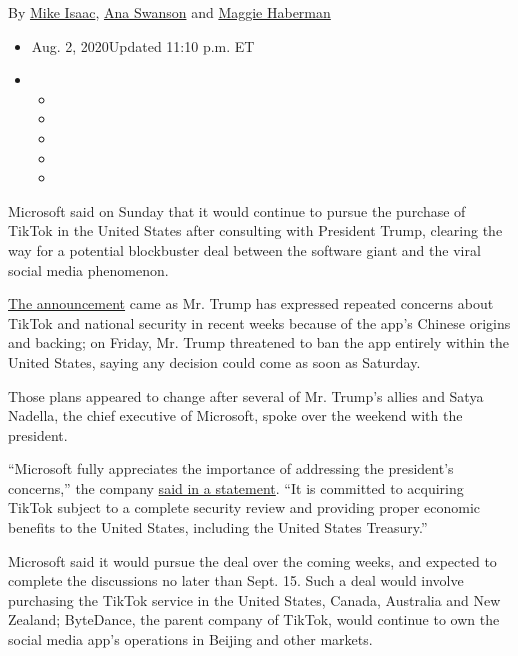 By \href{https://www.nytimes3xbfgragh.onion/by/mike-isaac}{Mike Isaac},
\href{https://www.nytimes3xbfgragh.onion/by/ana-swanson}{Ana Swanson}
and \href{https://www.nytimes3xbfgragh.onion/by/maggie-haberman}{Maggie
Haberman}

\begin{itemize}
\item
  Aug. 2, 2020Updated 11:10 p.m. ET
\item
  \begin{itemize}
  \item
  \item
  \item
  \item
  \item
  \end{itemize}
\end{itemize}

Microsoft said on Sunday that it would continue to pursue the purchase
of TikTok in the United States after consulting with President Trump,
clearing the way for a potential blockbuster deal between the software
giant and the viral social media phenomenon.

\href{https://blogs.microsoft.com/blog/2020/08/02/microsoft-to-continue-discussions-on-potential-tiktok-purchase-in-the-united-states/}{The
announcement} came as Mr. Trump has expressed repeated concerns about
TikTok and national security in recent weeks because of the app's
Chinese origins and backing; on Friday, Mr. Trump threatened to ban the
app entirely within the United States, saying any decision could come as
soon as Saturday.

Those plans appeared to change after several of Mr. Trump's allies and
Satya Nadella, the chief executive of Microsoft, spoke over the weekend
with the president.

``Microsoft fully appreciates the importance of addressing the
president's concerns,'' the company
\href{https://blogs.microsoft.com/blog/2020/08/02/microsoft-to-continue-discussions-on-potential-tiktok-purchase-in-the-united-states/}{said
in a statement}. ``It is committed to acquiring TikTok subject to a
complete security review and providing proper economic benefits to the
United States, including the United States Treasury.''

Microsoft said it would pursue the deal over the coming weeks, and
expected to complete the discussions no later than Sept. 15. Such a deal
would involve purchasing the TikTok service in the United States,
Canada, Australia and New Zealand; ByteDance, the parent company of
TikTok, would continue to own the social media app's operations in
Beijing and other markets.

